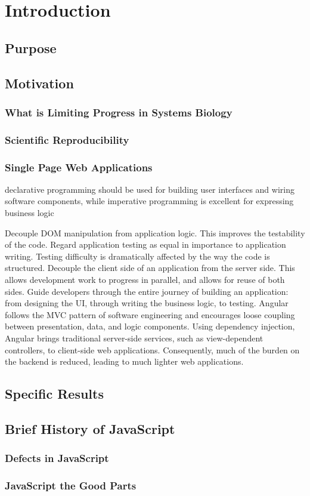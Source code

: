 \chapter{Introduction}

\section{Purpose}

\section{Motivation}

\subsection{What is Limiting Progress in Systems Biology}

\subsection{Scientific Reproducibility}

\subsection{Single Page Web Applications}

declarative programming should be used for building user interfaces and wiring software components, while imperative programming is excellent for expressing business logic


Decouple DOM manipulation from application logic. This improves the testability of the code. Regard application testing as equal in importance to application writing. Testing difficulty is dramatically affected by the way the code is structured.
Decouple the client side of an application from the server side. This allows development work to progress in parallel, and allows for reuse of both sides.
Guide developers through the entire journey of building an application: from designing the UI, through writing the business logic, to testing.
Angular follows the MVC pattern of software engineering and encourages loose coupling between presentation, data, and logic components. Using dependency injection, Angular brings traditional server-side services, such as view-dependent controllers, to client-side web applications. Consequently, much of the burden on the backend is reduced, leading to much lighter web applications.
\section{Specific Results}

\section{Brief History of JavaScript}

\subsection{Defects in JavaScript}
\subsection{JavaScript the Good Parts}
